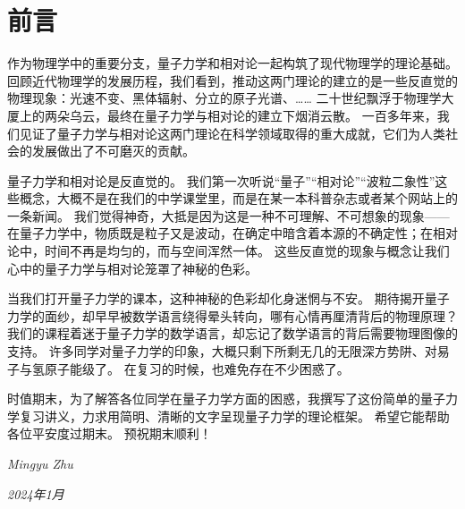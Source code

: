 
\section*{前言}

作为物理学中的重要分支，量子力学和相对论一起构筑了现代物理学的理论基础。
回顾近代物理学的发展历程，我们看到，推动这两门理论的建立的是一些反直觉的物理现象：光速不变、黑体辐射、分立的原子光谱、……
二十世纪飘浮于物理学大厦上的两朵乌云，最终在量子力学与相对论的建立下烟消云散。
一百多年来，我们见证了量子力学与相对论这两门理论在科学领域取得的重大成就，它们为人类社会的发展做出了不可磨灭的贡献。

量子力学和相对论是反直觉的。
我们第一次听说“量子”“相对论”“波粒二象性”这些概念，大概不是在我们的中学课堂里，而是在某一本科普杂志或者某个网站上的一条新闻。
我们觉得神奇，大抵是因为这是一种不可理解、不可想象的现象——在量子力学中，物质既是粒子又是波动，在确定中暗含着本源的不确定性；在相对论中，时间不再是均匀的，而与空间浑然一体。
这些反直觉的现象与概念让我们心中的量子力学与相对论笼罩了神秘的色彩。

当我们打开量子力学的课本，这种神秘的色彩却化身迷惘与不安。
期待揭开量子力学的面纱，却早早被数学语言绕得晕头转向，哪有心情再厘清背后的物理原理？
我们的课程着迷于量子力学的数学语言，却忘记了数学语言的背后需要物理图像的支持。
许多同学对量子力学的印象，大概只剩下所剩无几的无限深方势阱、对易子与氢原子能级了。
在复习的时候，也难免存在不少困惑了。

时值期末，为了解答各位同学在量子力学方面的困惑，我撰写了这份简单的量子力学复习讲义，力求用简明、清晰的文字呈现量子力学的理论框架。
希望它能帮助各位平安度过期末。
预祝期末顺利！

\hfill \textit{Mingyu Zhu}

\hfill \textit{2024年1月}
